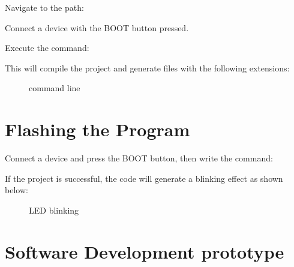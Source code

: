 \documentclass[letterpaper,10pt,english]{sphinxmanual}
\begin{document}
\sphinxAtStartPar
Navigate to the path:

\begin{sphinxVerbatim}[commandchars=\\\{\}]
 
\end{sphinxVerbatim}

\sphinxAtStartPar
Connect a device with the BOOT button pressed.

\sphinxAtStartPar
Execute the command:

\begin{sphinxVerbatim}[commandchars=\\\{\}]
 
\end{sphinxVerbatim}

\sphinxAtStartPar
This will compile the project and generate files with the following extensions:

\begin{figure}[htbp]
\centering
\capstart

\noindent{}
\caption{command line}\label{\detokenize{compile:id2}}\label{\detokenize{compile:files}}\end{figure}


\section{Flashing the Program}
\label{\detokenize{compile:flashing-the-program}}
\sphinxAtStartPar
Connect a device and press the BOOT button, then write the command:

\begin{sphinxVerbatim}[commandchars=\\\{\}]
 
\end{sphinxVerbatim}

\sphinxAtStartPar
If the project is successful, the code will generate a blinking effect as shown below:

\begin{figure}[htbp]
\centering
\capstart

\noindent{}
\caption{LED blinking}\label{\detokenize{compile:id3}}\label{\detokenize{compile:led}}\end{figure}


\section{Software Development prototype}
\label{\detokenize{compile:software-development-prototype}}
\end{document}
